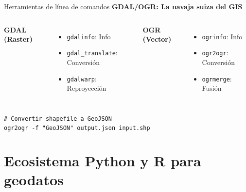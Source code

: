 \documentclass[10pt]{beamer}
\begin{document}
\begin{frame}{Herramientas de línea de comandos}
    \textbf{GDAL/OGR: La navaja suiza del GIS}
    
    \begin{columns}
        \textbf{GDAL (Raster)}
        \begin{itemize}
            \item \texttt{gdalinfo}: Info
            \item \texttt{gdal\_translate}: Conversión
            \item \texttt{gdalwarp}: Reproyección
        \end{itemize}
        
        \textbf{OGR (Vector)}
        \begin{itemize}
            \item \texttt{ogrinfo}: Info
            \item \texttt{ogr2ogr}: Conversión
            \item \texttt{ogrmerge}: Fusión
        \end{itemize}
    \end{columns}
    
    \vspace{0.3cm}
    \begin{tcolorbox}[colframe=gray!50]
        \tiny
        \texttt{\# Convertir shapefile a GeoJSON\\
        ogr2ogr -f "GeoJSON" output.json input.shp}
    \end{tcolorbox}
\end{frame}

\section{Ecosistema Python y R para geodatos}
\end{document}
